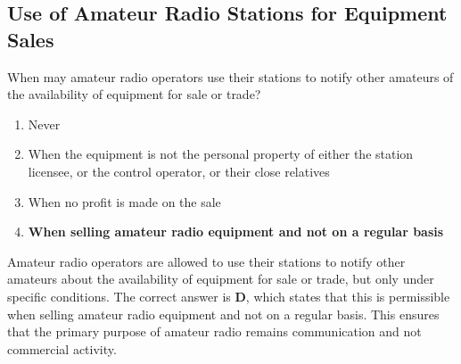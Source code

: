 \subsection{Use of Amateur Radio Stations for Equipment Sales}
\label{T1D05}

\begin{tcolorbox}[colback=gray!10!white,colframe=black!75!black,title=T1D05]
When may amateur radio operators use their stations to notify other amateurs of the availability of equipment for sale or trade?
\begin{enumerate}[label=\Alph*,noitemsep]
    \item Never
    \item When the equipment is not the personal property of either the station licensee, or the control operator, or their close relatives
    \item When no profit is made on the sale
    \item \textbf{When selling amateur radio equipment and not on a regular basis}
\end{enumerate}
\end{tcolorbox}

Amateur radio operators are allowed to use their stations to notify other amateurs about the availability of equipment for sale or trade, but only under specific conditions. The correct answer is \textbf{D}, which states that this is permissible when selling amateur radio equipment and not on a regular basis. This ensures that the primary purpose of amateur radio remains communication and not commercial activity.